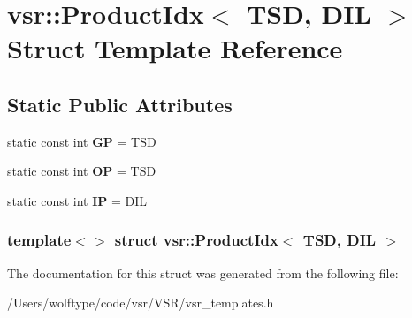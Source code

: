 \hypertarget{structvsr_1_1_product_idx_3_01_t_s_d_00_01_d_i_l_01_4}{\section{vsr\-:\-:Product\-Idx$<$ T\-S\-D, D\-I\-L $>$ Struct Template Reference}
\label{structvsr_1_1_product_idx_3_01_t_s_d_00_01_d_i_l_01_4}
}
\subsection*{Static Public Attributes}
\begin{DoxyCompactItemize}
\item 
\hypertarget{structvsr_1_1_product_idx_3_01_t_s_d_00_01_d_i_l_01_4_acb7635c2e26ada10581ca294f22cf5b0}{static const int {\bfseries G\-P} = T\-S\-D}\label{structvsr_1_1_product_idx_3_01_t_s_d_00_01_d_i_l_01_4_acb7635c2e26ada10581ca294f22cf5b0}

\item 
\hypertarget{structvsr_1_1_product_idx_3_01_t_s_d_00_01_d_i_l_01_4_a0664bedf6f1c529b45e7dd621319bc96}{static const int {\bfseries O\-P} = T\-S\-D}\label{structvsr_1_1_product_idx_3_01_t_s_d_00_01_d_i_l_01_4_a0664bedf6f1c529b45e7dd621319bc96}

\item 
\hypertarget{structvsr_1_1_product_idx_3_01_t_s_d_00_01_d_i_l_01_4_a026c0b103fbe9af318f10bd7a2d73041}{static const int {\bfseries I\-P} = D\-I\-L}\label{structvsr_1_1_product_idx_3_01_t_s_d_00_01_d_i_l_01_4_a026c0b103fbe9af318f10bd7a2d73041}

\end{DoxyCompactItemize}
\subsubsection*{template$<$$>$ struct vsr\-::\-Product\-Idx$<$ T\-S\-D, D\-I\-L $>$}



The documentation for this struct was generated from the following file\-:\begin{DoxyCompactItemize}
\item 
/\-Users/wolftype/code/vsr/\-V\-S\-R/vsr\-\_\-templates.\-h\end{DoxyCompactItemize}
